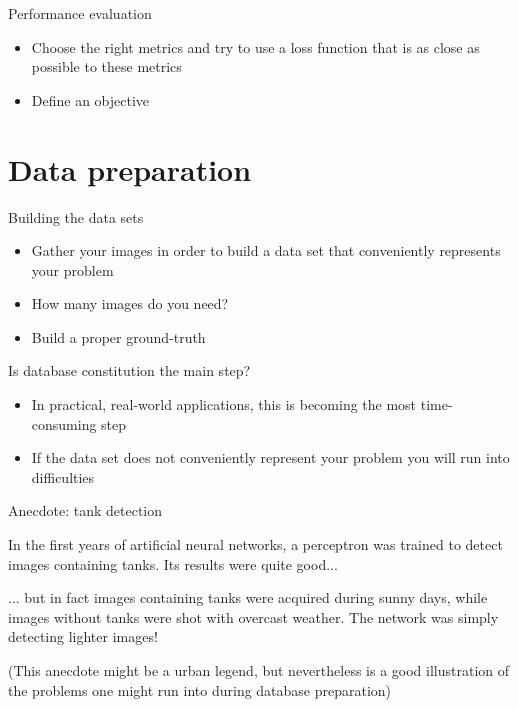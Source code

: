 \documentclass[xcolor=pdftex,dvipsnames,table,mathserif]{beamer}
\begin{document}
\begin{frame}{Performance evaluation}

  \begin{itemize}
  \item Choose the right metrics and try to use a loss function that is as close as possible to these metrics
  \item Define an objective
  \end{itemize}

\end{frame}


\section{Data preparation}

\begin{frame}{Building the data sets}
  \begin{itemize}
  \item Gather your images in order to build a data set that conveniently represents your problem
  \item How many images do you need?
  \item Build a proper ground-truth
  \end{itemize}

  \pause

  \begin{alertblock}{Is database constitution the main step?}
    \begin{itemize}
    \item In practical, real-world applications, this is becoming the most time-consuming step
    \item If the data set does not conveniently represent your problem you will run into difficulties
    \end{itemize}

  \end{alertblock}

\end{frame}

\begin{frame}{Anecdote: tank detection}

  In the first years of artificial neural networks, a perceptron was trained to detect images containing tanks. Its results were quite good...
  \vspace{1em}

  \pause

  ... but in fact images containing tanks were acquired during sunny days, while images without tanks were shot with overcast weather. The network was simply detecting lighter images!
  \vspace{1em}

  \pause

  (This anecdote might be a urban legend, but nevertheless is a good illustration of the problems one might run into during database preparation)
\end{frame}
\end{document}
